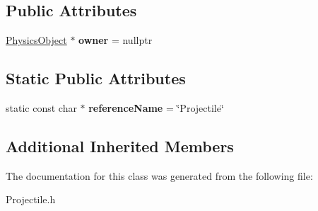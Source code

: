 \subsection*{Public Attributes}
\begin{DoxyCompactItemize}
\item 
\hypertarget{class_arena_1_1_projectile_ad599f12e789c8ca0c4eef25c434aa395}{\hyperlink{class_arena_1_1_physics_object}{Physics\+Object} $\ast$ {\bfseries owner} = nullptr}\label{class_arena_1_1_projectile_ad599f12e789c8ca0c4eef25c434aa395}

\end{DoxyCompactItemize}
\subsection*{Static Public Attributes}
\begin{DoxyCompactItemize}
\item 
\hypertarget{class_arena_1_1_projectile_a1e6590c1e44fc70ba0ee7cdb7c96bd24}{static const char $\ast$ {\bfseries reference\+Name} = \char`\"{}Projectile\char`\"{}}\label{class_arena_1_1_projectile_a1e6590c1e44fc70ba0ee7cdb7c96bd24}

\end{DoxyCompactItemize}
\subsection*{Additional Inherited Members}


The documentation for this class was generated from the following file\+:\begin{DoxyCompactItemize}
\item 
Projectile.\+h\end{DoxyCompactItemize}

